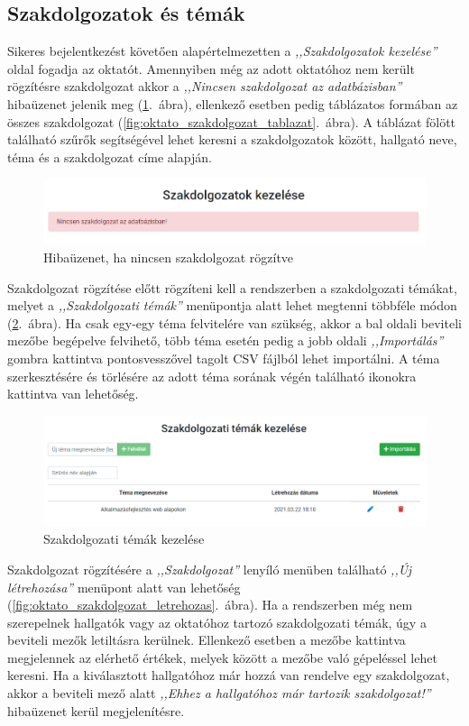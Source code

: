 \documentclass[
]{thesis-ekf}
\theoremstyle{definition}
\theoremstyle{remark}
\begin{document}
	\subsection{Szakdolgozatok és témák}
	Sikeres bejelentkezést követően alapértelmezetten a \emph{,,Szakdolgozatok kezelése''} oldal fogadja az oktatót. Amennyiben még az adott oktatóhoz nem került rögzítésre szakdolgozat akkor a \emph{,,Nincsen szakdolgozat az adatbázisban''} hibaüzenet jelenik meg (\ref{fig:oktato_szakdolgozat_nincs}.~ábra), ellenkező esetben pedig táblázatos formában az összes szakdolgozat (\ref{fig:oktato_szakdolgozat_tablazat}.~ábra). A táblázat fölött található szűrők segítségével lehet keresni a szakdolgozatok között, hallgató neve, téma és a szakdolgozat címe alapján.
	
	\begin{figure}[!h]
		\centering
		\includegraphics[width=12cm]{kepek/screenshots/oktato_szakdolgozat_nincs.png}
		\caption{Hibaüzenet, ha nincsen szakdolgozat rögzítve}
		\label{fig:oktato_szakdolgozat_nincs}
	\end{figure}
	
	Szakdolgozat rögzítése előtt rögzíteni kell a rendszerben a szakdolgozati témákat, melyet a \emph{,,Szakdolgozati témák''} menüpontja alatt lehet megtenni többféle módon (\ref{fig:oktato_tema_kezeles}.~ábra). Ha csak egy-egy téma felvitelére van szükség, akkor a bal oldali beviteli mezőbe begépelve felvihető, több téma esetén pedig a jobb oldali \emph{,,Importálás''} gombra kattintva pontosvesszővel tagolt CSV fájlból lehet importálni. A téma szerkesztésére és törlésére az adott téma sorának végén található ikonokra kattintva van lehetőség.
	
	\begin{figure}[!h]
		\centering
		\includegraphics[width=12cm]{kepek/screenshots/oktato_tema_kezeles.png}
		\caption{Szakdolgozati témák kezelése}
		\label{fig:oktato_tema_kezeles}
	\end{figure}
	\newpage
	Szakdolgozat rögzítésére a \emph{,,Szakdolgozat''} lenyíló menüben található \emph{,,Új létrehozása''} menüpont alatt van lehetőség (\ref{fig:oktato_szakdolgozat_letrehozas}.~ábra). Ha a rendszerben még nem szerepelnek hallgatók vagy az oktatóhoz tartozó szakdolgozati témák, úgy a beviteli mezők letiltásra kerülnek. Ellenkező esetben a mezőbe kattintva megjelennek az elérhető értékek, melyek között a mezőbe való gépeléssel lehet keresni. Ha a kiválasztott hallgatóhoz már hozzá van rendelve egy szakdolgozat, akkor a beviteli mező alatt \emph{,,Ehhez a hallgatóhoz már tartozik szakdolgozat!''} hibaüzenet kerül megjelenítésre.
	
\end{document}
